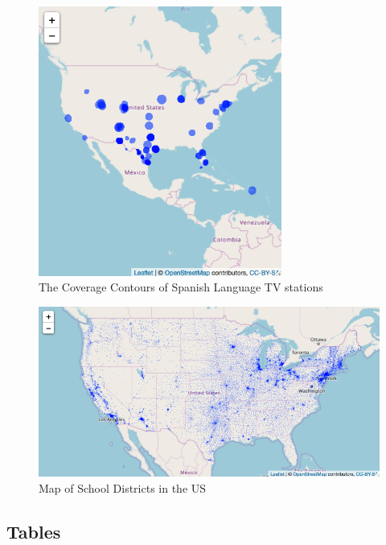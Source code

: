 \documentclass[11pt]{article}
\begin{document}
\begin{figure}[!hbtp]
\centering
\caption{The Coverage Contours of Spanish Language TV stations}\label{contourfig}
\includegraphics[width=8cm]{../../analysis/Output/img/SpanishContours.png}
\end{figure} 

\begin{figure}[!hbtp]
\centering
\caption{Map of School Districts in the US}\label{schooldistrictfig}
\includegraphics[width=12cm]{../../analysis/Output/img/LEAMap.png}
\end{figure} 

\clearpage
\subsection{Tables}

%
%




\end{document}
